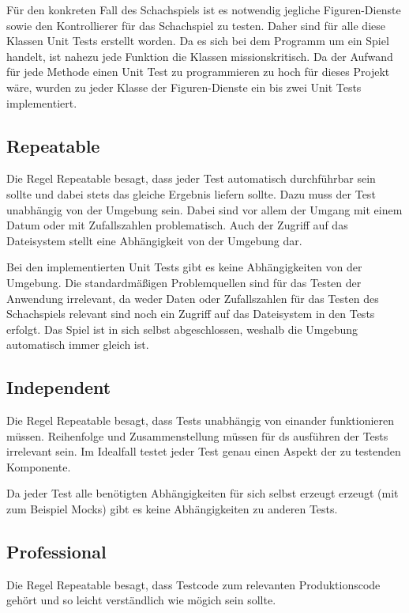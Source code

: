 Für den konkreten Fall des Schachspiels ist es notwendig jegliche Figuren-Dienste sowie den Kontrollierer für das Schachspiel zu testen. Daher sind für alle diese Klassen Unit Tests erstellt worden. Da es sich bei dem Programm um ein Spiel handelt, ist nahezu jede Funktion die Klassen missionskritisch. Da der Aufwand für jede Methode einen Unit Test zu programmieren zu hoch für dieses Projekt wäre, wurden zu jeder Klasse der Figuren-Dienste ein bis zwei Unit Tests implementiert.

\subsection{Repeatable}
Die Regel \glqq{}Repeatable\grqq{} besagt, dass jeder Test automatisch durchführbar sein sollte und dabei stets das gleiche Ergebnis liefern sollte. Dazu muss der Test unabhängig von der Umgebung sein. Dabei sind vor allem der Umgang mit einem Datum oder mit Zufallszahlen problematisch. Auch der Zugriff auf das Dateisystem stellt eine Abhängigkeit von der Umgebung dar.

Bei den implementierten Unit Tests gibt es keine Abhängigkeiten von der Umgebung. Die standardmäßigen Problemquellen sind für das Testen der Anwendung irrelevant, da weder Daten oder Zufallszahlen für das Testen des Schachspiels relevant sind noch ein Zugriff auf das Dateisystem in den Tests erfolgt. Das Spiel ist in sich selbst abgeschlossen, weshalb die Umgebung automatisch immer gleich ist.

\subsection{Independent}
Die Regel \glqq{}Repeatable\grqq{} besagt, dass Tests unabhängig von einander funktionieren müssen. Reihenfolge und Zusammenstellung müssen für ds ausführen der Tests irrelevant sein. Im Idealfall testet jeder Test genau einen Aspekt der zu testenden Komponente.

Da jeder Test alle benötigten Abhängigkeiten für sich selbst erzeugt erzeugt (mit zum Beispiel Mocks) gibt es keine Abhängigkeiten zu anderen Tests.

\subsection{Professional}
Die Regel \glqq{}Repeatable\grqq{} besagt, dass Testcode zum relevanten Produktionscode gehört und so leicht verständlich wie mögich sein sollte.

